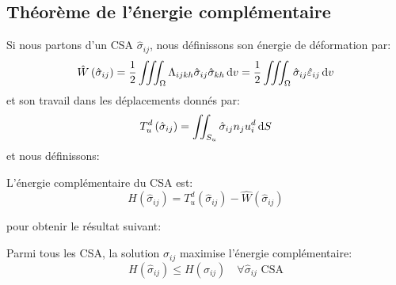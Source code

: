 \subsection{Théorème de l'énergie complémentaire} \label{ssec:Ch09-1.3}
Si nous partons d'un CSA $\hat{\sigma}_{ij}$, nous définissons son énergie de déformation par:
\begin{equation}
    \hat{W}\left( \hat{\sigma}_{ij} \right) = \frac{1}{2} \iiint_{\Omega} \Lambda_{ijkh} \hat{\sigma}_{ij} \hat{\sigma}_{kh} \mathop{\mathrm{{}d}}\mathopen{} v = \frac{1}{2} \iiint_{\Omega} \hat{\sigma}_{ij} \hat{\varepsilon}_{ij} \mathop{\mathrm{{}d}}\mathopen{} v
    \label{eq:Ch09-022}
\end{equation}
et son travail dans les déplacements donnés par: 
\begin{equation}
    T_{u}^d \left( \hat{\sigma}_{ij} \right) = \iint_{S_u} \hat{\sigma}_{ij} n_j u_i^d \mathop{\mathrm{{}d}}\mathopen{} S
    \label{eq:Ch09-023}
\end{equation}
et nous définissons: 
\begin{deff}
    L'énergie complémentaire du CSA est:
    \begin{equation}
        H \left( \hat{\sigma}_{ij} \right) = T_{u}^d \left( \hat{\sigma}_{ij} \right) - \hat{W}\left( \hat{\sigma}_{ij} \right)
        \label{eq:Ch09-024}
    \end{equation}
\end{deff}
\noindent pour obtenir le résultat suivant:
\begin{thm}
    Parmi tous les CSA, la solution $\sigma_{ij}$ maximise l'énergie complémentaire:
    \begin{equation}
        H \left( \hat{\sigma}_{ij} \right) \leq H \left( \sigma_{ij} \right) \quad \forall \hat{\sigma}_{ij} \text{ CSA}
        \label{eq:Ch09-025}
    \end{equation}
\end{thm}
